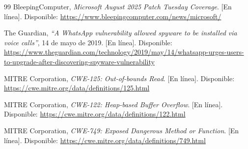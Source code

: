 \begin{thebibliography}{99}
BleepingComputer, \emph{Microsoft August 2025 Patch Tuesday Coverage}. [En línea]. Disponible: \url{https://www.bleepingcomputer.com/news/microsoft/}

The Guardian, \emph{``A WhatsApp vulnerability allowed spyware to be installed via voice calls''}, 14 de mayo de 2019. [En línea]. Disponible: \url{https://www.theguardian.com/technology/2019/may/14/whatsapp-urges-users-to-upgrade-after-discovering-spyware-vulnerability}

MITRE Corporation, \emph{CWE-125: Out-of-bounds Read}. [En línea]. Disponible: \url{https://cwe.mitre.org/data/definitions/125.html}

MITRE Corporation, \emph{CWE-122: Heap-based Buffer Overflow}. [En línea]. Disponible: \url{https://cwe.mitre.org/data/definitions/122.html}

MITRE Corporation, \emph{CWE-749: Exposed Dangerous Method or Function}. [En línea]. Disponible: \url{https://cwe.mitre.org/data/definitions/749.html}

\end{thebibliography}
